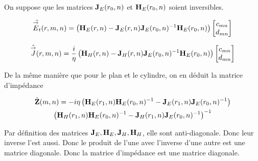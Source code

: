         On suppose que les matrices \(\mathbf{J}_{E}(r_0,n)\) et \(\mathbf{H}_{E}(r_0,n)\) soient inversibles.


        \begin{equation}
            \hat{{\overset{\rightarrow}{E}}_t}(r,m,n) =
            \left(
                \mathbf{H}_{E}(r,n)
                -
                \mathbf{J}_{E}(r,n)
                \mathbf{J}_{E}(r_0,n)^{-1}
                \mathbf{H}_{E}(r_0,n)
            \right)
            \begin{bmatrix}
                c_{mn}
                \\
                d_{mn}
            \end{bmatrix}
        \end{equation}


        \begin{equation}
            \hat{{\overset{\rightarrow}{J}}}(r,m,n) = \dfrac{i}{\eta}
            \left(
                \mathbf{H}_{H}(r,n)
                -
                \mathbf{J}_{H}(r,n)
                \mathbf{J}_{E}(r_0,n)^{-1}
                \mathbf{H}_{E}(r_0,n)
            \right)
            \begin{bmatrix}
                c_{mn}
                \\
                d_{mn}
            \end{bmatrix}
        \end{equation}

        De la même manière que pour le plan et le cylindre, on en déduit la matrice d'impédance

        \begin{multline}
            \hat{\mathbf{Z}}(m,n) = -i\eta
            \left(
                \mathbf{H}_{E}(r_1,n)
                \mathbf{H}_{E}(r_0,n)^{-1}
                -
                \mathbf{J}_{E}(r_1,n)
                \mathbf{J}_{E}(r_0,n)^{-1}
            \right)
            \\
            \left(
                \mathbf{H}_{H}(r_1,n)
                \mathbf{H}_{E}(r_0,n)^{-1}
                -
                \mathbf{J}_{H}(r_1,n)
                \mathbf{J}_{E}(r_0,n)^{-1}
            \right)^{-1}
        \end{multline}

        Par définition des matrices \(\mathbf{J}_E,\mathbf{H}_E,\mathbf{J}_H,\mathbf{H}_H\), elle sont anti-diagonale. Donc leur inverse l'est aussi. Donc le produit de l'une avec l'inverse d'une autre est une matrice diagonale. Donc la matrice d'impédance est une matrice diagonale.

